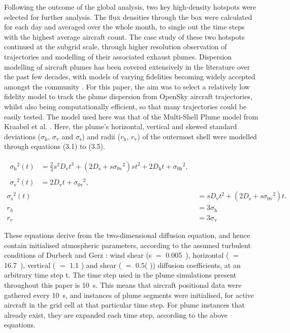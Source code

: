 Following the outcome of the global analysis, two key high-density hotspots were selected for further analysis. The flux densities through the box were calculated for each day and averaged over the whole month, to single out the time steps with the highest average aircraft count. The case study of these two hotspots continued at the subgrid scale, through higher resolution observation of trajectories and modelling of their associated exhaust plumes. Dispersion modelling of aircraft plumes has been covered extensively in the literature over the past few decades, with models of varying fidelities becoming widely accepted amongst the community \cite{Paoli2011}. For this paper, the aim was to select a relatively low fidelity model to track the plume dispersion from OpenSky aircraft trajectories, whilst also being computationally efficient, so that many trajectories could be easily tested. The model used here was that of the Multi-Shell Plume model from Kraab{\o}l et al. \cite{Kraabol2000a}. Here, the plume's horizontal, vertical and skewed standard deviations ($\sigma_{\mathrm{h}}$, $\sigma_{\mathrm{v}}$ and $\sigma_{\mathrm{s}}$) and radii ($r_{\mathrm{h}}$, $r_{\mathrm{v}}$) of the outermost shell were modelled through equations (3.1) to (3.5). 

\begin{align}
\begin{split}
	\label{sigma_h}
	{\sigma_{\mathrm{h}}}^{2}(t) {}&= \frac{2}{3} s^2 D_{\mathrm{v}} t^3 + (2 D_{\mathrm{s}} + s {\sigma_{\mathrm{0v}}}^2) s t^2 + 2 D_{\mathrm{h}} t + {\sigma_{\mathrm{0h}}}^2,
\end{split} \\
\begin{split}
	{\sigma_{\mathrm{v}}}^{2}(t) {}&= 2 D_{\mathrm{v}} t + {\sigma_{\mathrm{0v}}}^2,
	\end{split}\\
	{\sigma_{\mathrm{s}}}^{2}(t) {}&= s D_{\mathrm{v}} t^2 + (2 D_{\mathrm{s}} + s {\sigma_{\mathrm{0v}}}^2) t. \\[10pt]
	r_h {}&= 3 \sigma_{\mathrm{h}} \\
	\label{r_v}
	r_v {}&= 3 \sigma_{\mathrm{v}}
\end{align}

These equations derive from the two-dimensional diffusion equation, and hence contain initialised atmospheric parameters, according to the assumed turbulent conditions of Durbeck and Gerz \cite{Durbeck1996}: wind shear (s $=$ 0.005~), horizontal ( $=$ 16.7~), vertical ( $=$ 1.1 ) and shear ( $=$ 0.5( )) diffusion coefficients, at an arbitrary time step t. The time step used in the plume simulations present throughout this paper is 10~s. This means that aircraft positional data were gathered every 10~s, and instances of plume segments were initialised, for active aircraft in the grid cell at that particular time step. For plume instances that already exist, they are expanded each time step, according to the above equations.

